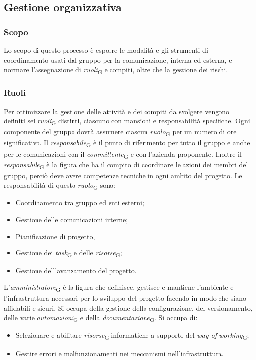 \subsection{Gestione organizzativa}
\subsubsection{Scopo}
Lo scopo di questo processo è esporre le modalità e gli strumenti di coordinamento usati dal gruppo per la comunicazione, interna ed esterna, e normare l'assegnazione di \textit{ruoli}\textsubscript{G} e compiti, oltre che la gestione dei rischi.

\subsubsection{Ruoli}
Per ottimizzare la gestione delle attività e dei compiti da svolgere vengono definiti sei \textit{ruoli}\textsubscript{G} distinti, ciascuno con mansioni e responsabilità specifiche. Ogni componente del gruppo dovrà assumere ciascun \textit{ruolo}\textsubscript{G} per un numero di ore significativo.
Il \textit{responsabile}\textsubscript{G} è il punto di riferimento per tutto il gruppo e anche per le comunicazioni con il \textit{committente}\textsubscript{G} e con l'azienda proponente.
Inoltre il \textit{responsabile}\textsubscript{G} è la figura che ha il compito di coordinare le azioni dei membri del gruppo, perciò deve avere competenze tecniche in ogni ambito del progetto. Le responsabilità di questo \textit{ruolo}\textsubscript{G} sono:
\begin{itemize}
    \item Coordinamento tra gruppo ed enti esterni;
    \item Gestione delle comunicazioni interne;
    \item Pianificazione di progetto,
    \item Gestione dei \textit{task}\textsubscript{G} e delle \textit{risorse}\textsubscript{G};
    \item Gestione dell'avanzamento del progetto.
\end{itemize}
L'\textit{amministratore}\textsubscript{G} è la figura che definisce, gestisce e mantiene l’ambiente e l’infrastruttura necessari per lo sviluppo del progetto facendo in modo che siano affidabili e sicuri. Si occupa della gestione della configurazione, del versionamento, delle varie \textit{automazioni}\textsubscript{G} e della \textit{documentazione}\textsubscript{G}. Si occupa di:
\begin{itemize}
    \item Selezionare e abilitare \textit{risorse}\textsubscript{G} informatiche a supporto del \textit{way of working}\textsubscript{G};
    \item Gestire errori e malfunzionamenti nei meccanismi nell’infrastruttura.
\end{itemize}

